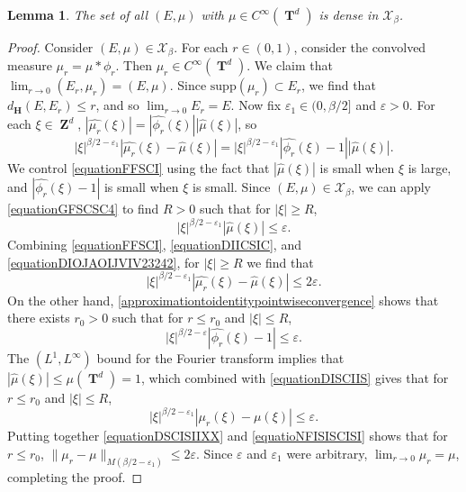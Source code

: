 \documentclass[dvipsnames,letterpaper,12pt]{article}
\numberwithin{equation}{section}
\DeclareMathOperator{\ZZ}{\mathbf{Z}}
\DeclareMathOperator{\TT}{\mathbf{T}}
\newtheorem{lemma}[theorem]{Lemma}
\numberwithin{theorem}{section}
\begin{document}
\begin{lemma} \label{smoothdensitylemma}
    The set of all $(E,\mu)$ with $\mu \in C^\infty(\TT^d)$ is dense in $\mathcal{X}_\beta$.
\end{lemma}
\begin{proof}
    Consider $(E,\mu) \in \mathcal{X}_\beta$. For each $r \in (0,1)$, consider the convolved measure $\mu_r = \mu * \phi_r$. Then $\mu_r \in C^\infty(\TT^d)$. We claim that $\lim_{r \to 0} (E_r,\mu_r) = (E,\mu)$. Since $\text{supp}(\mu_r) \subset E_r$, we find that $d_{\mathbf{H}}(E,E_r) \leq r$, and so $\lim_{r \to 0} E_r = E$. Now fix $\varepsilon_1 \in (0,\beta/2]$ and $\varepsilon > 0$. For each $\xi \in \ZZ^d$, $|\widehat{\mu_r}(\xi)| = |\widehat{\phi_r}(\xi)| |\widehat{\mu}(\xi)|$, so
    \begin{equation} \label{equationFFSCI}
        |\xi|^{\beta/2 - \varepsilon_1} |\widehat{\mu_r}(\xi) - \widehat{\mu}(\xi)| = |\xi|^{\beta/2 - \varepsilon_1} |\widehat{\phi_r}(\xi) - 1| |\widehat{\mu}(\xi)|.
    \end{equation}
    We control \eqref{equationFFSCI} using the fact that $|\widehat{\mu}(\xi)|$ is small when $\xi$ is large, and $|\widehat{\phi_r}(\xi) - 1|$ is small when $\xi$ is small. Since $(E,\mu) \in \mathcal{X}_\beta$, we can apply \eqref{equationGFSCSC4} to find $R > 0$ such that for $|\xi| \geq R$,
    \begin{equation} \label{equationDIICSIC}
        |\xi|^{\beta/2 - \varepsilon_1} |\widehat{\mu}(\xi)| \leq \varepsilon.
    \end{equation}
    Combining \eqref{equationFFSCI}, \eqref{equationDIICSIC}, and \eqref{equationDIOJAOIJVIV23242}, for $|\xi| \geq R$ we find that
    \begin{equation} \label{equationDSCISIIXX}
        |\xi|^{\beta/2 - \varepsilon_1} |\widehat{\mu_r}(\xi) - \widehat{\mu}(\xi)| \leq 2 \varepsilon.
    \end{equation}
    On the other hand, \eqref{approximationtoidentitypointwiseconvergence} shows that there exists $r_0 > 0$ such that for $r \leq r_0$ and $|\xi| \leq R$,
    \begin{equation} \label{equationDISCIIS}
        |\xi|^{\beta/2 - \varepsilon} |\widehat{\phi_r}(\xi) - 1| \leq \varepsilon.
    \end{equation}
    The $(L^1,L^\infty)$ bound for the Fourier transform implies that $|\widehat{\mu}(\xi)| \leq \mu(\TT^d) = 1$, which combined with \eqref{equationDISCIIS} gives that for $r \leq r_0$ and $|\xi| \leq R$,
    \begin{equation} \label{equatioNFISISCISI}
        |\xi|^{\beta/2 - \varepsilon_1} |\mu_r(\xi) - \mu(\xi)| \leq \varepsilon.
    \end{equation}
    Putting together \eqref{equationDSCISIIXX} and \eqref{equatioNFISISCISI} shows that for $r \leq r_0$, $\| \mu_r - \mu \|_{M(\beta/2 - \varepsilon_1)} \leq 2\varepsilon$. Since $\varepsilon$ and $\varepsilon_1$ were arbitrary, $\lim_{r \to 0} \mu_r = \mu$, completing the proof.
\end{proof}
\end{document}
